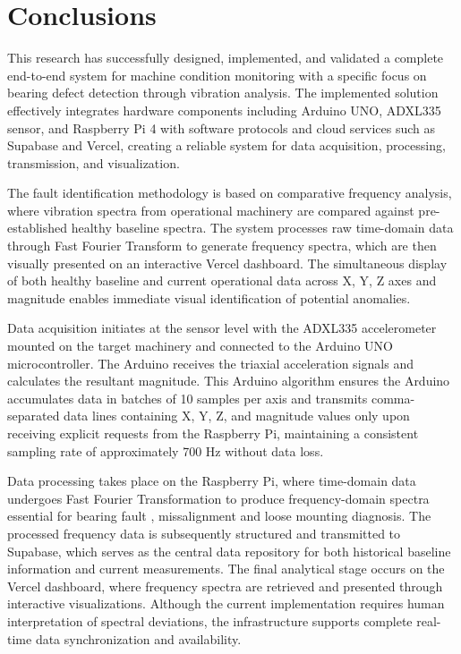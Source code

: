 \chapter{Conclusions}
\label{chap_last}
{
This research has successfully designed, implemented, and validated a complete end-to-end system for machine condition monitoring with a specific focus on bearing defect detection through vibration analysis. The implemented solution effectively integrates hardware components including Arduino UNO, ADXL335 sensor, and Raspberry Pi 4 with software protocols and cloud services such as Supabase and Vercel, creating a reliable system for data acquisition, processing, transmission, and visualization.

The fault identification methodology is based on comparative frequency analysis, where vibration spectra from operational machinery are compared against pre-established healthy baseline spectra. The system processes raw time-domain data through Fast Fourier Transform to generate frequency spectra, which are then visually presented on an interactive Vercel dashboard. The simultaneous display of both healthy baseline and current operational data across X, Y, Z axes and magnitude enables immediate visual identification of potential anomalies.

Data acquisition initiates at the sensor level with the ADXL335 accelerometer mounted on the target machinery and connected to the Arduino UNO microcontroller. The Arduino receives the triaxial acceleration signals and calculates the resultant magnitude. This Arduino algorithm ensures the Arduino accumulates data in batches of 10 samples per axis and transmits comma-separated data lines containing X, Y, Z, and magnitude values only upon receiving explicit requests from the Raspberry Pi, maintaining a consistent sampling rate of approximately 700 Hz without data loss.

Data processing takes place on the Raspberry Pi, where time-domain data undergoes Fast Fourier Transformation to produce frequency-domain spectra essential for bearing fault  , missalignment and loose mounting diagnosis. The processed frequency data is subsequently structured and transmitted to Supabase, which serves as the central data repository for both historical baseline information and current measurements. The final analytical stage occurs on the Vercel dashboard, where frequency spectra are retrieved and presented through interactive visualizations. Although the current implementation requires human interpretation of spectral deviations, the infrastructure supports complete real-time data synchronization and availability.

}
